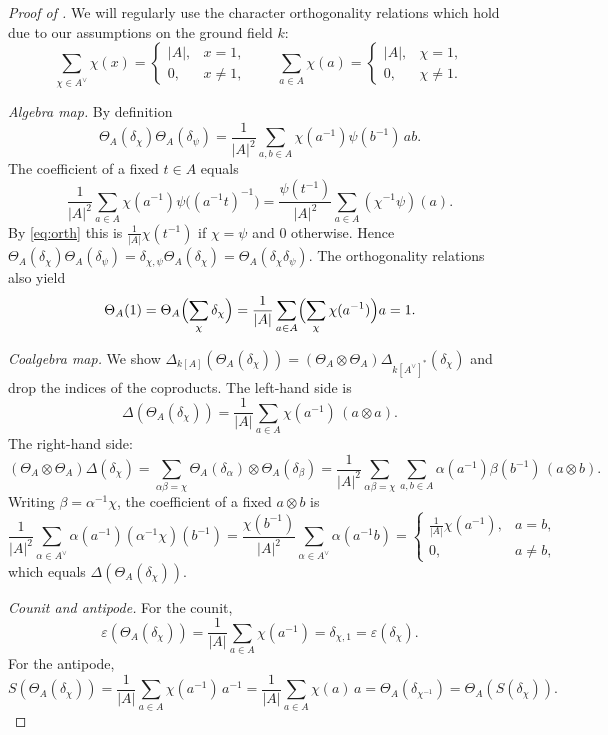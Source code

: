 \documentclass[a4paper,10pt]{amsart}
\theoremstyle{definition}
\theoremstyle{remark}
\newcommand\D{\Delta}
\begin{document}
\begin{proof}[Proof of ]
We will regularly use the character orthogonality relations which hold due to our assumptions on the ground field $k$:
\begin{equation}\label{eq:orth}
\sum_{\chi\in A^\vee}\chi(x)=
\begin{cases}
|A|,& x=1,\\
0,& x\neq 1,
\end{cases}
\qquad
\sum_{a\in A}\chi(a)=
\begin{cases}
|A|,& \chi=1,\\
0,& \chi\neq 1.
\end{cases}
\end{equation}

\medskip\noindent
{\it Algebra map.} By definition 
$$ \Theta_A(\delta_\chi)\Theta_A(\delta_\psi)
=\frac1{|A|^2}\sum_{a,b\in A}\chi(a^{-1})\psi(b^{-1})\,ab.
$$
The coefficient of a fixed $t\in A$ equals
\[
\frac1{|A|^2}\sum_{a\in A}\chi(a^{-1})\psi\bigl((a^{-1}t)^{-1}\bigr)
=\frac{\psi(t^{-1})}{|A|^2}\sum_{a\in A}(\chi^{-1}\psi)(a).
\]
By \eqref{eq:orth} this is $\frac1{|A|}\chi(t^{-1})$ if $\chi=\psi$ and $0$ otherwise. Hence
$\Theta_A(\delta_\chi)\Theta_A(\delta_\psi)=\delta_{\chi,\psi}\Theta_A(\delta_\chi)=\Theta_A(\delta_\chi\delta_\psi)$.
The orthogonality relations also yield
\[
\Theta_A(1)=\Theta_A\Bigl(\sum_{\chi}\delta_\chi\Bigr)
=\frac1{|A|}\sum_{a\in A}\Bigl(\sum_{\chi}\chi(a^{-1})\Bigr)a
=1.
\]


\medskip\noindent
{\it Coalgebra map.}
We show $\D_{k[A]} (\Theta_A(\delta_\chi))=(\Theta_A\otimes \Theta_A)\D_{k[A^{\vee}]^*} (\delta_\chi)$ and drop the indices of the coproducts.
The left-hand side is
\[
\D (\Theta_A(\delta_\chi))=\frac1{|A|}\sum_{a\in A}\chi(a^{-1})\,(a\otimes a).
\]
The right-hand side:
\[
(\Theta_A\otimes\Theta_A)\D (\delta_\chi)
=\sum_{\alpha\beta=\chi}\Theta_A(\delta_\alpha)\otimes\Theta_A(\delta_\beta)
=\frac1{|A|^2}\sum_{\alpha\beta=\chi}\sum_{a,b\in A}\alpha(a^{-1})\beta(b^{-1})\,(a\otimes b).
\]
Writing $\beta=\alpha^{-1}\chi$, the coefficient of a fixed $a\otimes b$ is
\[
\frac1{|A|^2}\sum_{\alpha\in A^\vee}\alpha(a^{-1})(\alpha^{-1}\chi)(b^{-1})
=\frac{\chi(b^{-1})}{|A|^2}\sum_{\alpha\in A^\vee}\alpha(a^{-1}b)
=\begin{cases}
\frac1{|A|}\chi(a^{-1}),& a=b,\\
0,& a\neq b,
\end{cases}
\]
which equals $\D (\Theta_A(\delta_\chi))$.

\medskip\noindent
{\it Counit and antipode.}
For the counit,
\[
\varepsilon(\Theta_A(\delta_\chi))=\frac1{|A|}\sum_{a\in A}\chi(a^{-1})=\delta_{\chi,1}=\varepsilon(\delta_\chi).
\]
For the antipode,
\[
S(\Theta_A(\delta_\chi))
=\frac1{|A|}\sum_{a\in A}\chi(a^{-1})\,a^{-1}
=\frac1{|A|}\sum_{a\in A}\chi(a)\,a
=\Theta_A(\delta_{\chi^{-1}})
=\Theta_A(S(\delta_\chi)).
\]




\end{proof}
\end{document}
